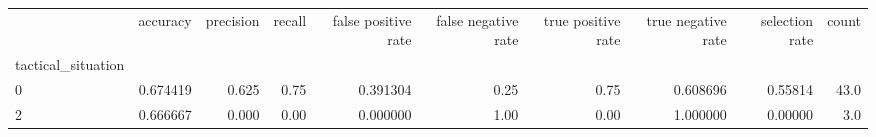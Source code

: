 \begin{tabular}{lrrrrrrrrr}
\toprule
{} &  accuracy &  precision &  recall &  false positive rate &  false negative rate &  true positive rate &  true negative rate &  selection rate &  count \\
tactical\_situation &           &            &         &                      &                      &                     &                     &                 &        \\
\midrule
0                  &  0.674419 &      0.625 &    0.75 &             0.391304 &                 0.25 &                0.75 &            0.608696 &         0.55814 &   43.0 \\
2                  &  0.666667 &      0.000 &    0.00 &             0.000000 &                 1.00 &                0.00 &            1.000000 &         0.00000 &    3.0 \\
\bottomrule
\end{tabular}
